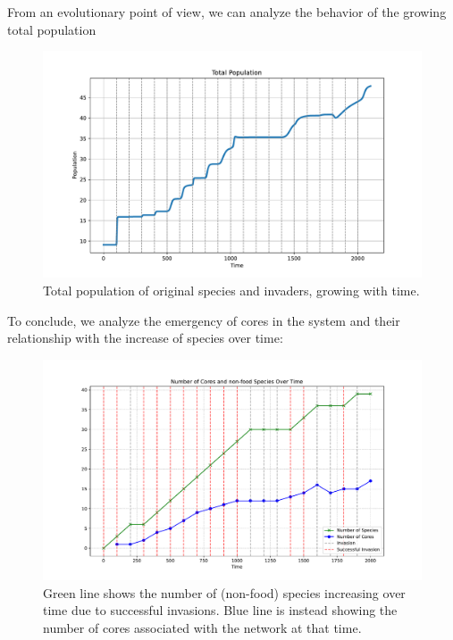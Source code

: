 \documentclass{article}
\begin{document}
From an evolutionary point of view, we can analyze the behavior of the growing total population

\begin{figure}[H]
	\centering
	\includegraphics[width=0.6\linewidth]{Invasions_total_auto.pdf}
	\caption{\small{Total population of original species and invaders, growing with time.}}
	\label{Fig. 17}
\end{figure}

To conclude, we analyze the emergency of cores in the system and their relationship with the increase of species over time:

\begin{figure}[H]
	\centering
	\includegraphics[width=0.6\linewidth]{Cores_species_auto.pdf}
	\caption{\small{Green line shows the number of (non-food) species increasing over time due to successful invasions. Blue line is instead showing the number of cores associated with the network at that time. }}
	\label{Fig. 18}
\end{figure}



\printbibliography
\end{document}
